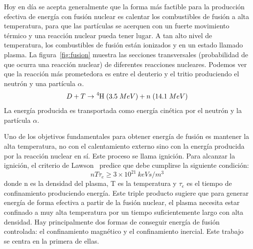 Hoy en día se acepta generalmente que la forma más factible para la producción efectiva de energía 
con fusión nuclear es calentar los combustibles de fusión a alta temperatura, para que las partículas se acerquen
con un fuerte movimiento térmico y una reacción nuclear pueda tener lugar. A tan alto nivel de
temperatura, los combustibles de fusión están ionizados y en un estado llamado plasma. La figura~\ref{fig:fusion} muestra las
secciones transversales (probabilidad de que ocurra una reacción nuclear) de diferentes reacciones nucleares.
Podemos ver que la reacción más prometedora es entre el deuterio y el tritio produciendo el neutrón
y una partícula $\alpha$.
\begin{equation}\label{eq:deutreaction}
    D+T\rightarrow\ce{^{4}H}\;(3.5\;MeV)+n\;(14.1\;MeV)
\end{equation}
La energía producida es transportada como energía cinética por el neutrón y la partícula $\alpha$.\par
Uno de los objetivos fundamentales para obtener energía de fusión es mantener la alta temperatura, no con el calentamiento 
externo sino con la energía producida por la reacción nuclear en sí. Este
proceso se llama ignición. Para alcanzar la ignición, el criterio de Lawson~\cite{Lawson_1957} predice que 
debe cumplirse la siguiente condición:
\begin{equation}\label{eq:lawson}
    nT\tau_e\geq3\times10^{21}\:keVs/m^{3}
\end{equation}
donde n es la densidad del plasma, T es la temperatura y $\tau_e$ es el tiempo de confinamiento produciendo energía.
Este triple producto sugiere que para generar energía de forma efectiva a partir de la fusión nuclear, el plasma
necesita estar confinado a muy alta temperatura por un tiempo suficientemente largo con alta densidad.
Hay principalmente dos formas de conseguir energía de fusión controlada: el confinamiento magnético 
y el confinamiento inercial. Este trabajo se centra en la primera de ellas.\par
